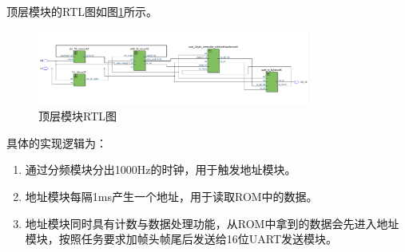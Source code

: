 \documentclass[UTF8]{ctexart}
\begin{document}
顶层模块的RTL图如图\ref{fig:top_rtl}所示。
\begin{figure}[!ht]
    \centering
    \includegraphics[width=0.8\textwidth]{top_rtl.png}

    \caption{顶层模块RTL图}
    \label{fig:top_rtl}
\end{figure}

具体的实现逻辑为：
\begin{enumerate}
    \item 通过分频模块分出1000Hz的时钟，用于触发地址模块。
    \item 地址模块每隔1ms产生一个地址，用于读取ROM中的数据。
    \item 地址模块同时具有计数与数据处理功能，从ROM中拿到的数据会先进入地址模块，按照任务要求加帧头帧尾后发送给16位UART发送模块。
\end{enumerate}
\end{document}
